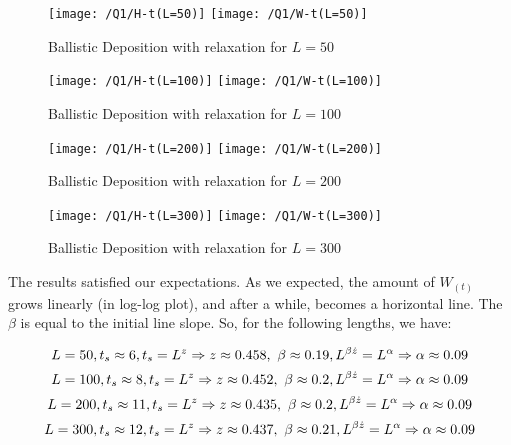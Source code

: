\documentclass{article}
\begin{document}
    \begin{figure}[!htb]
        \centering
        \texttt{[image: /Q1/H-t(L=50)]}
        \label{fig:1.2}
        \texttt{[image: /Q1/W-t(L=50)]}
        \label{fig:1.3}
        \caption{Ballistic Deposition with relaxation for $L=50$}
    \end{figure}
    \begin{figure}[!htb]
        \centering
        \texttt{[image: /Q1/H-t(L=100)]}
        \label{fig:1.4}
        \texttt{[image: /Q1/W-t(L=100)]}
        \label{fig:1.5}
        \caption{Ballistic Deposition with relaxation for $L=100$}
    \end{figure}
    \begin{figure}[!htb]
        \centering
        \texttt{[image: /Q1/H-t(L=200)]}
        \label{fig:1.6}
        \texttt{[image: /Q1/W-t(L=200)]}
        \label{fig:1.7}
        \caption{Ballistic Deposition with relaxation for $L=200$}
    \end{figure}
    \pagebreak
    \begin{figure}[!htb]
        \centering
        \texttt{[image: /Q1/H-t(L=300)]}
        \label{fig:1.8}
        \texttt{[image: /Q1/W-t(L=300)]}
        \label{fig:1.9}
        \caption{Ballistic Deposition with relaxation for $L=300$}
    \end{figure}

    The results satisfied our expectations.
    As we expected, the amount of $W_{(t)}$ grows linearly (in log-log plot),
    and after a while, becomes a horizontal line.
    The $\beta$ is equal to the initial line slope.
    So, for the following lengths, we have:

    \begin{equation}
        \centering
        L = 50, t_{s} \approx 6, t_{s} = L^z \Rightarrow z \approx 0.458,\
        \beta \approx 0.19, L^{\beta \dot z} = L^{\alpha} \Rightarrow \alpha \approx 0.09
    \end{equation}
    \begin{equation}
        \centering
        L = 100, t_{s} \approx 8, t_{s} = L^z \Rightarrow z \approx 0.452,\
        \beta \approx 0.2, L^{\beta \dot z} = L^{\alpha} \Rightarrow \alpha \approx 0.09
    \end{equation}
    \begin{equation}
        \centering
        L = 200, t_{s} \approx 11, t_{s} = L^z \Rightarrow z \approx 0.435,\
        \beta \approx 0.2, L^{\beta \dot z} = L^{\alpha} \Rightarrow \alpha \approx 0.09
    \end{equation}
    \begin{equation}
        \centering
        L = 300, t_{s} \approx 12, t_{s} = L^z \Rightarrow z \approx 0.437,\
        \beta \approx 0.21, L^{\beta \dot z} = L^{\alpha} \Rightarrow \alpha \approx 0.09
    \end{equation}
\end{document}
